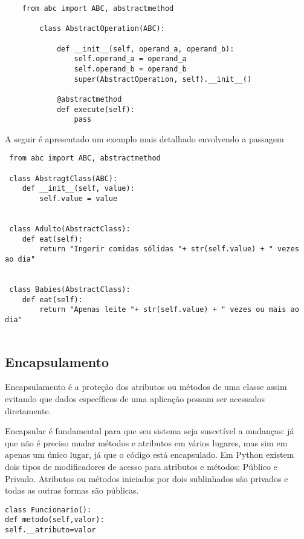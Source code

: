 \documentclass[11pt,a4paper]{article}
\begin{document}
% 

\begin{lstlisting}
    from abc import ABC, abstractmethod 
 
        class AbstractOperation(ABC):
 
            def __init__(self, operand_a, operand_b):
                self.operand_a = operand_a
                self.operand_b = operand_b
                super(AbstractOperation, self).__init__()
    
            @abstractmethod
            def execute(self):
                pass
	\end{lstlisting}
	
\vspace{0.9in}

A seguir é apresentado um exemplo mais detalhado envolvendo a passagem 

 \begin{lstlisting}
 from abc import ABC, abstractmethod
     
 class AbstragtClass(ABC): 
	def __init__(self, value):
		self.value = value
         
         
 class Adulto(AbstractClass):         
	def eat(self):
		return "Ingerir comidas sólidas "+ str(self.value) + " vezes ao dia"
 
 
 class Babies(AbstractClass):         
	def eat(self):
		return "Apenas leite "+ str(self.value) + " vezes ou mais ao dia"
 
 \end{lstlisting}


\subsection{Encapsulamento}
Encapsulamento é a proteção dos atributos ou métodos de uma classe assim evitando 
que dados específicos de uma aplicação possam ser acessados diretamente.

Encapsular é fundamental para que seu sistema seja suscetível a mudanças: já que não é preciso mudar
métodos e atributos em vários lugares, mas sim em apenas um único lugar, já que o código está encapsulado.
Em Python existem dois tipos de modificadores de acesso para atributos e métodos: Público e Privado.
Atributos ou métodos iniciados por dois sublinhados são privados e todas as outras formas são públicas.
\begin{lstlisting}
class Funcionario():
def metodo(self,valor):
self.__atributo=valor

\end{lstlisting} 
\end{document}
